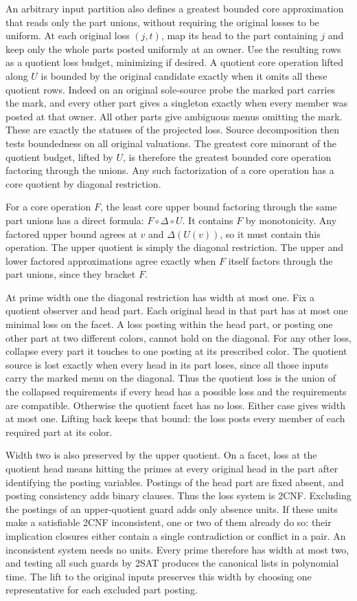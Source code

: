 An arbitrary input partition also defines a
greatest bounded core approximation that
reads only the part unions, without requiring
the original losses to be uniform. At each
original loss $(j,t)$, map its head to the
part containing $j$ and keep only the whole
parts posted uniformly at an owner. Use the
resulting rows as a quotient loss budget,
minimizing if desired. A quotient core
operation lifted along $U$ is bounded by
the original candidate exactly when it
omits all these quotient rows. Indeed on
an original sole-source probe the marked
part carries the mark, and every other
part gives a singleton exactly when every
member was posted at that owner. All
other parts give ambiguous menus omitting
the mark. These are exactly the statuses
of the projected loss. Source decomposition
then tests boundedness on all original
valuations. The greatest core minorant
of the quotient budget, lifted by $U$,
is therefore the greatest bounded core
operation factoring through the unions.
Any such factorization of a core operation
has a core quotient by diagonal restriction.

For a core operation $F$, the least
core upper bound factoring through the
same part unions has a direct formula:
$F\circ\Delta\circ U$. It contains $F$
by monotonicity. Any factored upper
bound agrees at $v$ and $\Delta(U(v))$,
so it must contain this operation.
The upper quotient is simply the
diagonal restriction. The upper and
lower factored approximations agree
exactly when $F$ itself factors through
the part unions, since they bracket $F$.

At prime width one the diagonal
restriction has width at most one.
Fix a quotient observer and head part.
Each original head in that part has
at most one minimal loss on the facet.
A loss posting within the head part,
or posting one other part at two
different colors, cannot hold on the
diagonal. For any other loss, collapse
every part it touches to one posting
at its prescribed color. The quotient
source is lost exactly when every head
in its part loses, since all those inputs
carry the marked menu on the diagonal.
Thus the quotient loss is the union
of the collapsed requirements if every
head has a possible loss and the
requirements are compatible.
Otherwise the quotient facet has no
loss. Either case gives width at most
one. Lifting back keeps that bound:
the loss posts every member of each
required part at its color.

Width two is also preserved by the upper
quotient. On a facet, loss at the quotient
head means hitting the primes at every
original head in the part after identifying
the posting variables. Postings of the
head part are fixed absent, and posting
consistency adds binary clauses. Thus the
loss system is 2CNF. Excluding the postings
of an upper-quotient guard adds only
absence units. If these units make a
satisfiable 2CNF inconsistent, one or
two of them already do so: their
implication closures either contain a
single contradiction or conflict in a
pair. An inconsistent system needs no
units. Every prime therefore has width
at most two, and testing all such guards
by 2SAT produces the canonical lists
in polynomial time. The lift to the
original inputs preserves this width by
choosing one representative for each
excluded part posting.

